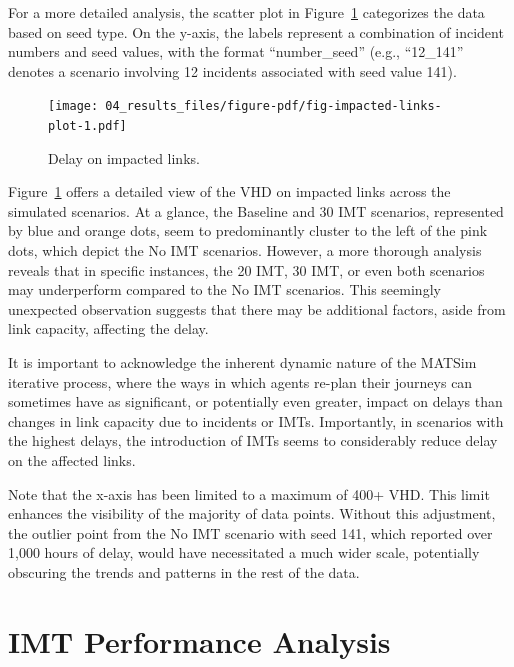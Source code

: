 \documentclass[fancy, oneside, mastersfancy, ms]{byuthesis}
\begin{document}
For a more detailed analysis, the scatter plot in
Figure~\ref{fig-impacted-links-plot} categorizes the data based on seed
type. On the y-axis, the labels represent a combination of incident
numbers and seed values, with the format ``number\_seed'' (e.g.,
``12\_141'' denotes a scenario involving 12 incidents associated with
seed value 141).

\begin{figure}

{\centering \texttt{[image: 04\_results\_files/figure-pdf/fig-impacted-links-plot-1.pdf]}

}

\caption{\label{fig-impacted-links-plot}Delay on impacted links.}

\end{figure}

Figure~\ref{fig-impacted-links-plot} offers a detailed view of the VHD
on impacted links across the simulated scenarios. At a glance, the
Baseline and 30 IMT scenarios, represented by blue and orange dots, seem
to predominantly cluster to the left of the pink dots, which depict the
No IMT scenarios. However, a more thorough analysis reveals that in
specific instances, the 20 IMT, 30 IMT, or even both scenarios may
underperform compared to the No IMT scenarios. This seemingly unexpected
observation suggests that there may be additional factors, aside from
link capacity, affecting the delay.

It is important to acknowledge the inherent dynamic nature of the MATSim
iterative process, where the ways in which agents re-plan their journeys
can sometimes have as significant, or potentially even greater, impact
on delays than changes in link capacity due to incidents or IMTs.
Importantly, in scenarios with the highest delays, the introduction of
IMTs seems to considerably reduce delay on the affected links.

Note that the x-axis has been limited to a maximum of 400+ VHD. This
limit enhances the visibility of the majority of data points. Without
this adjustment, the outlier point from the No IMT scenario with seed
141, which reported over 1,000 hours of delay, would have necessitated a
much wider scale, potentially obscuring the trends and patterns in the
rest of the data.

\hypertarget{sec-IMT-performance}{%
\section{IMT Performance Analysis}\label{sec-IMT-performance}}
\end{document}
